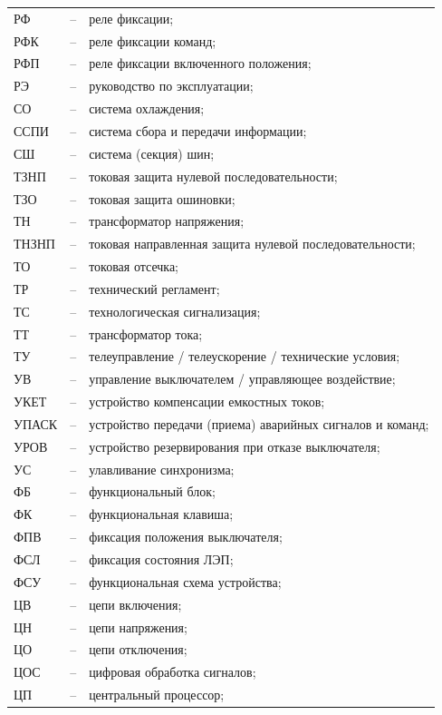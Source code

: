 \begin{longtable}{>{\raggedright\arraybackslash}m{2cm}>{\raggedright\arraybackslash}m{0.5cm}>{\raggedright\arraybackslash}m{20cm}}
РФ & -- & реле фиксации; \\
РФК & -- & реле фиксации команд; \\
РФП & -- & реле фиксации включенного положения; \\
РЭ & -- & руководство по эксплуатации; \\
СО & -- & система охлаждения; \\
ССПИ & -- & система сбора и передачи информации; \\
СШ & -- & система (секция) шин; \\
ТЗНП & -- & токовая защита нулевой последовательности; \\
ТЗО & -- & токовая защита ошиновки; \\
ТН & -- & трансформатор напряжения; \\
ТНЗНП & -- & токовая направленная защита нулевой последовательности; \\
ТО & -- & токовая отсечка; \\
ТР & -- & технический регламент; \\
ТС & -- & технологическая сигнализация; \\
ТТ & -- & трансформатор тока; \\
ТУ & -- & телеуправление / телеускорение / технические условия; \\
УВ & -- & управление выключателем / управляющее воздействие; \\
УКЕТ & -- & устройство компенсации емкостных токов; \\
УПАСК & -- & устройство передачи (приема) аварийных сигналов и команд; \\
УРОВ & -- & устройство резервирования при отказе выключателя; \\
УС & -- & улавливание синхронизма; \\
ФБ & -- & функциональный блок; \\
ФК & -- & функциональная клавиша; \\
ФПВ & -- & фиксация положения выключателя; \\
ФСЛ & -- & фиксация состояния ЛЭП; \\
ФСУ & -- & функциональная схема устройства; \\
ЦВ & -- & цепи включения; \\
ЦН & -- & цепи напряжения; \\
ЦО & -- & цепи отключения; \\
ЦОС & -- & цифровая обработка сигналов; \\
ЦП & -- & центральный процессор; \\

\end{longtable}
